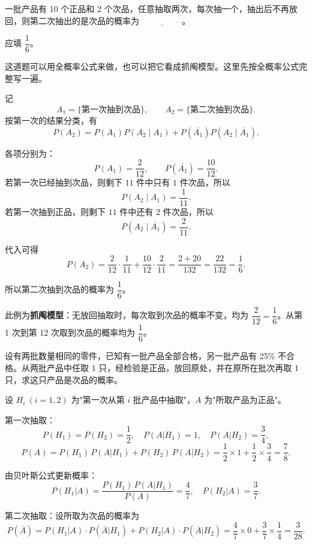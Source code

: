 ﻿\documentclass[lang=cn,11pt]{elegantbook}
\begin{document}
\begin{exercise}\label{exer:1-15}
一批产品有 10 个正品和 2 个次品，任意抽取两次，每次抽一个，抽出后不再放回，则第二次抽出的是次品的概率为 \(\underline{\hspace{2cm}}\)。
\end{exercise}

\begin{solution}
应填 \(\dfrac16\)。

这道题可以用全概率公式来做，也可以把它看成抓阄模型。这里先按全概率公式完整写一遍。

记
\[
A_1=\{\text{第一次抽到次品}\},\qquad A_2=\{\text{第二次抽到次品}\}.
\]
按第一次的结果分类，有
\[
P(A_2)=P(A_1)P(A_2\mid A_1)+P(\overline{A_1})P(A_2\mid \overline{A_1}).
\]

各项分别为：
\[
P(A_1)=\frac{2}{12},\qquad P(\overline{A_1})=\frac{10}{12}.
\]
若第一次已经抽到次品，则剩下 \(11\) 件中只有 \(1\) 件次品，所以
\[
P(A_2\mid A_1)=\frac{1}{11}.
\]
若第一次抽到正品，则剩下 \(11\) 件中还有 \(2\) 件次品，所以
\[
P(A_2\mid \overline{A_1})=\frac{2}{11}.
\]

代入可得
\[
P(A_2)=\frac{2}{12}\cdot\frac{1}{11}+\frac{10}{12}\cdot\frac{2}{11}
=\frac{2+20}{132}
=\frac{22}{132}
=\frac16.
\]

所以第二次抽到次品的概率为 \(\dfrac16\)。
\end{solution}

\begin{note}
此例为\textbf{抓阄模型}：无放回抽取时，每次取到次品的概率不变，均为 \(\dfrac{2}{12} = \dfrac{1}{6}\)。从第 1 次到第 12 次取到次品的概率均为 \(\dfrac{1}{6}\)。
\end{note}

\begin{exercise}\label{exer:1-16}
设有两批数量相同的零件，已知有一批产品全部合格，另一批产品有 25\% 不合格。从两批产品中任取 1 只，经检验是正品，放回原处，并在原所在批次再取 1 只，求这只产品是次品的概率。
\end{exercise}

\begin{solution}
设 \(H_i\ (i=1,2)\) 为"第一次从第 \(i\) 批产品中抽取"，\(A\) 为"所取产品为正品"。

第一次抽取：
\[
P(H_1)=P(H_2)=\frac{1}{2},\quad P(A|H_1)=1,\quad P(A|H_2)=\frac{3}{4},
\]
\[
P(A) = P(H_1)\,P(A|H_1) + P(H_2)\,P(A|H_2) = \frac{1}{2} \times 1 + \frac{1}{2} \times \frac{3}{4} = \frac{7}{8}.
\]

由贝叶斯公式更新概率：
\[
P(H_1|A) = \frac{P(H_1)\,P(A|H_1)}{P(A)} = \frac{4}{7}, \quad P(H_2|A) = \frac{3}{7}.
\]

第二次抽取：设所取为次品的概率为
\[
P(\overline{A}) = P(H_1|A) \cdot P(\overline{A}|H_1) + P(H_2|A) \cdot P(\overline{A}|H_2) = \frac{4}{7} \times 0 + \frac{3}{7} \times \frac{1}{4} = \frac{3}{28}.
\]
\end{solution}
\end{document}
